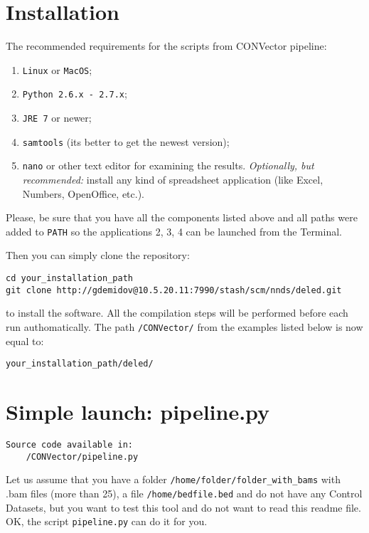 \documentclass{article}
\begin{document}
\section{Installation}


The recommended requirements for the scripts from CONVector pipeline:
\begin{enumerate}
    \item \texttt{Linux} or \texttt{MacOS};
    \item \texttt{Python 2.6.x - 2.7.x};
    \item \texttt{JRE 7} or newer;
    \item \texttt{samtools} (its better to get the newest version);
    \item \texttt{nano} or other text editor for examining the results. {\it Optionally, but recommended:} install any kind of spreadsheet application (like Excel, Numbers, OpenOffice, etc.).
\end{enumerate}


Please, be sure that you have all the components listed above and all paths were added to \texttt{PATH} so the applications 2, 3, 4 can be launched from the Terminal.

Then you can simply clone the repository: 

\begin{lstlisting}[style=DOS, caption={Installation of the package}]
cd your_installation_path
git clone http://gdemidov@10.5.20.11:7990/stash/scm/nnds/deled.git
\end{lstlisting}
    
 to install the software. All the compilation steps will be performed before each run authomatically. The path \texttt{/CONVector/} from the examples listed below is now equal to:
 
 \texttt{your\_installation\_path/deled/}




\newpage
\section{Simple launch: pipeline.py}
\begin{verbatim}
Source code available in:
    /CONVector/pipeline.py
\end{verbatim}

Let us assume that you have a folder \texttt{/home/folder/folder\_with\_bams} with .bam files (more than 25), a file \texttt{/home/bedfile.bed} and do not have any Control Datasets, but you want to test this tool and do not want to read this readme file. OK, the script \texttt{pipeline.py} can do it for you.
\end{document}
